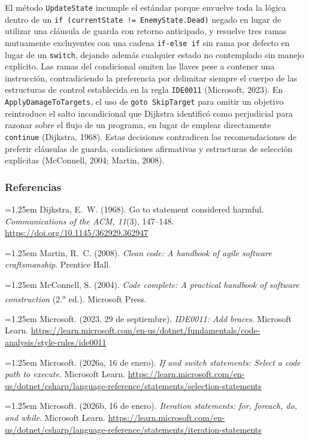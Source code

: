El método \texttt{UpdateState} incumple el estándar porque envuelve toda la lógica dentro de un \texttt{if (currentState != EnemyState.Dead)} negado en lugar de utilizar una cláusula de guarda con retorno anticipado, y resuelve tres ramas mutuamente excluyentes con una cadena \texttt{if-else if} sin rama por defecto en lugar de un \texttt{switch}, dejando además cualquier estado no contemplado sin manejo explícito. Las ramas del condicional omiten las llaves pese a contener una instrucción, contradiciendo la preferencia por delimitar siempre el cuerpo de las estructuras de control establecida en la regla \texttt{IDE0011} (Microsoft, 2023). En \texttt{ApplyDamageToTargets}, el uso de \texttt{goto SkipTarget} para omitir un objetivo reintroduce el salto incondicional que Dijkstra identificó como perjudicial para razonar sobre el flujo de un programa, en lugar de emplear directamente \texttt{continue} (Dijkstra, 1968). Estas decisiones contradicen las recomendaciones de preferir cláusulas de guarda, condiciones afirmativas y estructuras de selección explícitas (McConnell, 2004; Martin, 2008).

\subsubsection{Referencias}

\noindent\hangindent=1.25em Dijkstra, E.~W. (1968). Go to statement considered harmful. \textit{Communications of the ACM, 11}(3), 147--148. \url{https://doi.org/10.1145/362929.362947}

\smallskip
\noindent\hangindent=1.25em Martin, R.~C. (2008). \textit{Clean code: A handbook of agile software craftsmanship}. Prentice Hall.

\smallskip
\noindent\hangindent=1.25em McConnell, S. (2004). \textit{Code complete: A practical handbook of software construction} (2.\textsuperscript{a} ed.). Microsoft Press.

\smallskip
\noindent\hangindent=1.25em Microsoft. (2023, 29 de septiembre). \textit{IDE0011: Add braces}. Microsoft Learn. \url{https://learn.microsoft.com/en-us/dotnet/fundamentals/code-analysis/style-rules/ide0011}

\smallskip
\noindent\hangindent=1.25em Microsoft. (2026a, 16 de enero). \textit{If and switch statements: Select a code path to execute}. Microsoft Learn. \url{https://learn.microsoft.com/en-us/dotnet/csharp/language-reference/statements/selection-statements}

\smallskip
\noindent\hangindent=1.25em Microsoft. (2026b, 16 de enero). \textit{Iteration statements: for, foreach, do, and while}. Microsoft Learn. \url{https://learn.microsoft.com/en-us/dotnet/csharp/language-reference/statements/iteration-statements}
